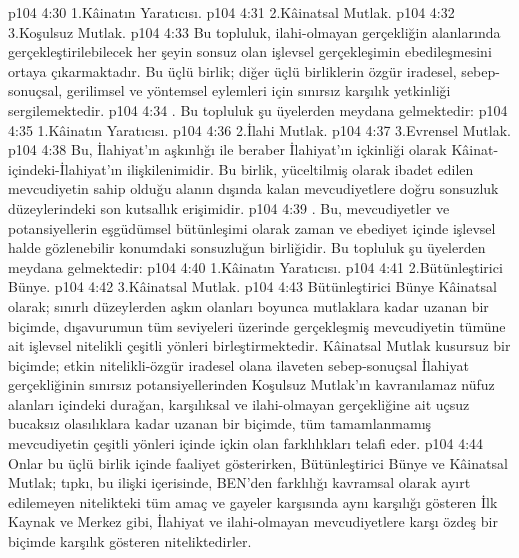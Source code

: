 \vs p104 4:30 1.\bibnobreakspace Kâinatın Yaratıcısı.
\vs p104 4:31 2.\bibnobreakspace Kâinatsal Mutlak.
\vs p104 4:32 3.\bibnobreakspace Koşulsuz Mutlak.
\vs p104 4:33 Bu topluluk, ilahi\hyp{}olmayan gerçekliğin alanlarında gerçekleştirilebilecek her şeyin sonsuz olan işlevsel gerçekleşimin ebedileşmesini ortaya çıkarmaktadır. Bu üçlü birlik; diğer üçlü birliklerin özgür iradesel, sebep\hyp{}sonuçsal, gerilimsel ve yöntemsel eylemleri için sınırsız karşılık yetkinliği sergilemektedir.
\vs p104 4:34 . Bu topluluk şu üyelerden meydana gelmektedir:
\vs p104 4:35 1.\bibnobreakspace Kâinatın Yaratıcısı.
\vs p104 4:36 2.\bibnobreakspace İlahi Mutlak.
\vs p104 4:37 3.\bibnobreakspace Evrensel Mutlak.
\vs p104 4:38 Bu, İlahiyat’ın aşkınlığı ile beraber İlahiyat’ın içkinliği olarak Kâinat\hyp{}içindeki\hyp{}İlahiyat’ın ilişkilenimidir. Bu birlik, yüceltilmiş olarak ibadet edilen mevcudiyetin sahip olduğu alanın dışında kalan mevcudiyetlere doğru sonsuzluk düzeylerindeki son kutsallık erişimidir.
\vs p104 4:39 . Bu, mevcudiyetler ve potansiyellerin eşgüdümsel bütünleşimi olarak zaman ve ebediyet içinde işlevsel halde gözlenebilir konumdaki sonsuzluğun birliğidir. Bu topluluk şu üyelerden meydana gelmektedir:
\vs p104 4:40 1.\bibnobreakspace Kâinatın Yaratıcısı.
\vs p104 4:41 2.\bibnobreakspace Bütünleştirici Bünye.
\vs p104 4:42 3.\bibnobreakspace Kâinatsal Mutlak.
\vs p104 4:43 Bütünleştirici Bünye Kâinatsal olarak; sınırlı düzeylerden aşkın olanları boyunca mutlaklara kadar uzanan bir biçimde, dışavurumun tüm seviyeleri üzerinde gerçekleşmiş mevcudiyetin tümüne ait işlevsel nitelikli çeşitli yönleri birleştirmektedir. Kâinatsal Mutlak kusursuz bir biçimde; etkin nitelikli\hyp{}özgür iradesel olana ilaveten sebep\hyp{}sonuçsal İlahiyat gerçekliğinin sınırsız potansiyellerinden Koşulsuz Mutlak’ın kavranılamaz nüfuz alanları içindeki durağan, karşılıksal ve ilahi\hyp{}olmayan gerçekliğine ait uçsuz bucaksız olasılıklara kadar uzanan bir biçimde, tüm tamamlanmamış mevcudiyetin çeşitli yönleri içinde içkin olan farklılıkları telafi eder.
\vs p104 4:44 Onlar bu üçlü birlik içinde faaliyet gösterirken, Bütünleştirici Bünye ve Kâinatsal Mutlak; tıpkı, bu ilişki içerisinde, BEN’den farklılığı kavramsal olarak ayırt edilemeyen nitelikteki tüm amaç ve gayeler karşısında aynı karşılığı gösteren İlk Kaynak ve Merkez gibi, İlahiyat ve ilahi\hyp{}olmayan mevcudiyetlere karşı özdeş bir biçimde karşılık gösteren niteliktedirler.
